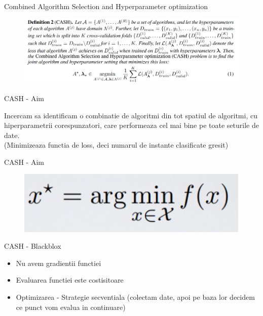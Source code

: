 \documentclass{beamer}
\begin{document}
\begin{frame}{Combined Algorithm Selection and Hyperparameter optimization}
	\begin{figure}[H]
		\centering
		\includegraphics[scale=0.5]{formula_cash.PNG}
	\end{figure}
\end{frame}


\begin{frame}{CASH - Aim}
	\begin{center}
		Incercam sa identificam o combinatie de algoritmi din tot spatiul de algoritmi, cu hiperparametrii corespunzatori, care performeaza cel mai bine pe toate seturile de date. \\
		(Minimizeaza functia de loss, deci numarul de instante clasificate gresit)
	\end{center}
\end{frame}

\begin{frame}{CASH - Aim}
	\begin{figure}[H]
		\centering
		\includegraphics[scale=0.75]{optim.PNG}
	\end{figure}
\end{frame}


\begin{frame}{CASH - Blackblox}
	\begin{itemize}
		\item Nu avem gradientii functiei
		\item Evaluarea functiei este costisitoare
		\item Optimizarea - Strategie secventiala (colectam date, apoi pe baza lor decidem ce punct vom evalua in continuare)
	\end{itemize}
\end{frame}
\end{document}
